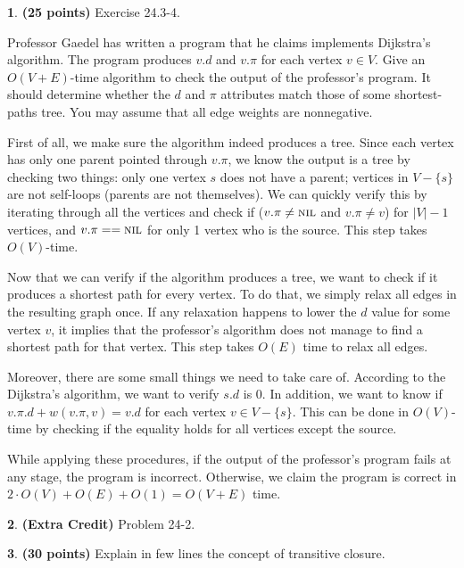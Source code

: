 \documentclass[11pt]{article}
\theoremstyle{definition}
\theoremstyle{theorem}
\newtheorem{prob}{}
\newcommand{\solution}{\medskip\noindent{\color{DarkBlue}\textbf{Solution:}}}
\begin{document}
\newpage
\begin{prob} \textbf{(25 points)} Exercise 24.3-4.
\end{prob}

Professor Gaedel has written a program that he claims implements Dijkstra’s algorithm. The program produces $v.d$ and $v.\pi$ for each vertex $v \in V$. Give an $O(V + E)$-time algorithm to check the output of the professor’s program. It should determine whether the $d$ and $\pi$ attributes match those of some shortest-paths tree. You may assume that all edge weights are nonnegative.

\solution

First of all, we make sure the algorithm indeed produces a tree. Since each vertex has only one parent pointed through $v.\pi$, we know the output is a tree by checking two things: only one vertex $s$ does not have a parent; vertices in $V - \{s\}$ are not self-loops (parents are not themselves). We can quickly verify this by iterating through all the vertices and check if ($v.\pi \ne \textproc{\textsc{nil}}$ and $v.\pi \ne v$) for $|V| - 1$ vertices, and $v.\pi == \textproc{\textsc{nil}}$ for only 1 vertex who is the source. This step takes $O(V)$-time.

Now that we can verify if the algorithm produces a tree, we want to check if it produces a shortest path for every vertex. To do that, we simply relax all edges in the resulting graph once. If any relaxation happens to lower the $d$ value for some vertex $v$, it implies that the professor's algorithm does not manage to find a shortest path for that vertex. This step takes $O(E)$ time to relax all edges. 

Moreover, there are some small things we need to take care of. According to the Dijkstra's algorithm, we want to verify $s.d$ is 0. In addition, we want to know if $v.\pi.d + w(v.\pi, v) = v.d$ for each vertex $v \in V - \{s\}$. This can be done in $O(V)$-time by checking if the equality holds for all vertices except the source.

While applying these procedures, if the output of the professor's program fails at any stage, the program is incorrect. Otherwise, we claim the program is correct in $2 \cdot O(V) + O(E) + O(1) = O(V + E)$ time.


\newpage
\begin{prob} \textbf{(Extra Credit)} Problem 24-2.
\end{prob}
\solution


\newpage
\begin{prob} \textbf{(30 points)} Explain in few lines the concept of transitive closure.
\end{prob}
\solution
\end{document}

